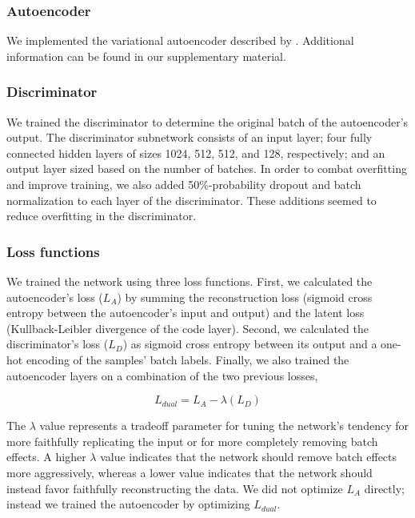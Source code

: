 \documentclass[notitlepage]{article}
\begin{document}
\subsubsection{Autoencoder}

We implemented the variational autoencoder \cite{louizos_variational_2015} described by \citet[Chapter 15]{geron_hands-machine_2017}.
Additional information can be found in our supplementary material.

\subsubsection{Discriminator}

We trained the discriminator to determine the original batch of the autoencoder's output.
The discriminator subnetwork consists of an input layer; four fully connected hidden layers of sizes 1024, 512, 512, and 128, respectively; and an output layer sized based on the number of batches.
In order to combat overfitting and improve training, we also added 50\%-probability dropout \cite{srivastava_dropout_2014} and batch normalization \cite{ioffe_batch_2015} to each layer of the discriminator.
These additions seemed to reduce overfitting in the discriminator.

\subsubsection{Loss functions}

We trained the network using three loss functions.
First, we calculated the autoencoder's loss ($L_A$) by summing the reconstruction loss (sigmoid cross entropy between the autoencoder's input and output) and the latent loss (Kullback-Leibler divergence \cite{kullback_information_1951} of the code layer).
Second, we calculated the discriminator's loss ($L_D$) as sigmoid cross entropy between its output and a one-hot encoding of the samples' batch labels.
Finally, we also trained the autoencoder layers on a combination of the two previous losses,

\begin{equation}
	\label{dual_loss}
	L_{dual} = L_A - \lambda{}(L_D)
\end{equation}

The $\lambda$ value represents a tradeoff parameter for tuning the network's tendency for more faithfully replicating the input or for more completely removing batch effects.
A higher $\lambda$ value indicates that the network should remove batch effects more aggressively, whereas a lower value indicates that the network should instead favor faithfully reconstructing the data.
We did not optimize $L_A$ directly; instead we trained the autoencoder by optimizing $L_{dual}$.
\end{document}

